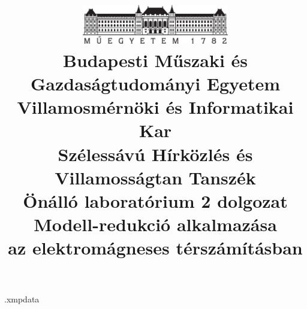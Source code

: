 \begin{filecontents*}[overwrite]{\jobname.xmpdata}
\end{filecontents*}

\documentclass[a4paper,12pt,titlepage]{article}
\usepackage{ucs}
\usepackage[T1]{fontenc}
\usepackage[utf8]{inputenc}
\usepackage[magyar]{babel}
\usepackage{amsfonts}
\usepackage{amsmath,bm}
\usepackage{amssymb}
\usepackage{graphicx}
\usepackage{subcaption}
\usepackage{blkarray,booktabs,bigstrut} %
\usepackage[left=20mm,right=20mm,top=20mm,bottom=25mm]{geometry}
\usepackage{hyperref}
\usepackage{listings}
\usepackage[range-phrase=--, range-units=single]{siunitx}
\usepackage{xcolor}
\usepackage[a-3u]{pdfx}


\DeclareMathOperator{\rot}{rot}
\DeclareMathOperator{\divergence}{div}

\sloppy %
\def\hyph{-\penalty0\hskip0pt\relax} %

\frenchspacing
\pagestyle{plain} 


\title{
    \centering
    \includegraphics[width=0.48\textwidth]{kep/bme_logo.pdf} \\
    \vspace{0.5cm}
    \large{\bf Budapesti Műszaki és Gazdaságtudományi Egyetem \\
    Villamosmérnöki és Informatikai Kar \\
    Szélessávú Hírközlés és Villamosságtan Tanszék}\\
    \vspace{4cm}
    \large{Önálló laboratórium 2 dolgozat} \\
    \vspace{2cm}
    \Large{\bf{Modell-redukció alkalmazása\\ az elektromágneses térszámításban}} \\
    \vspace{2cm}
}

